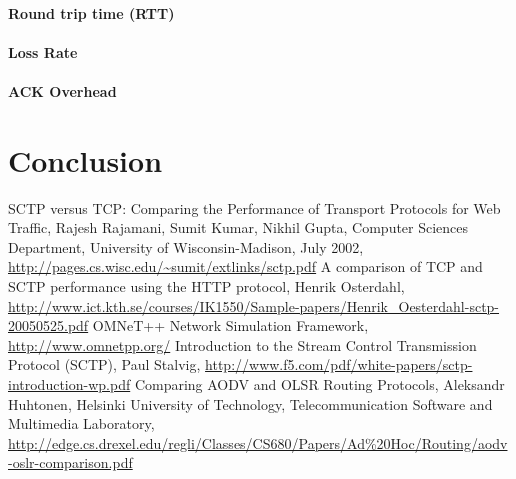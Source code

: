 \documentclass[a4paper]{article}
\begin{document}
\paragraph{Round trip time (RTT)}

\paragraph{Loss Rate}

\paragraph{ACK Overhead}

\section{Conclusion}

\begin{thebibliography}{99}
 SCTP versus TCP: Comparing the Performance of Transport Protocols for Web Traffic, Rajesh Rajamani, Sumit Kumar, Nikhil Gupta, Computer Sciences Department, University of Wisconsin-Madison, July 2002, \url{http://pages.cs.wisc.edu/~sumit/extlinks/sctp.pdf}
 A comparison of TCP and SCTP performance using the HTTP protocol, Henrik Osterdahl, \url{http://www.ict.kth.se/courses/IK1550/Sample-papers/Henrik_Oesterdahl-sctp-20050525.pdf}
 OMNeT++ Network Simulation Framework, \url{http://www.omnetpp.org/}
 Introduction to the Stream Control Transmission Protocol (SCTP), Paul Stalvig, \url{http://www.f5.com/pdf/white-papers/sctp-introduction-wp.pdf}
 Comparing AODV and OLSR Routing Protocols, Aleksandr Huhtonen, Helsinki University of Technology, Telecommunication Software and Multimedia Laboratory, \url{http://edge.cs.drexel.edu/regli/Classes/CS680/Papers/Ad%20Hoc/Routing/aodv-oslr-comparison.pdf}
\end{thebibliography}
\end{document}
